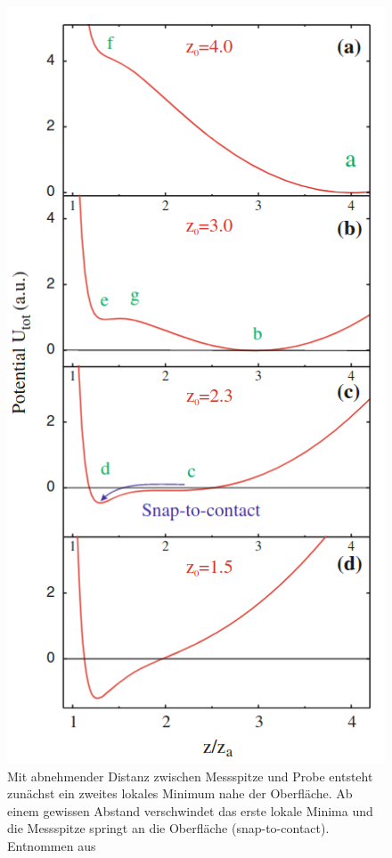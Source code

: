           \begin{figure}
            \includegraphics[scale = 0.45]{pictures/pot_contact.png}
            \caption{Mit abnehmender Distanz zwischen Messspitze und Probe entsteht zunächst ein zweites lokales Minimum nahe der Oberfläche. Ab einem gewissen Abstand verschwindet das erste lokale Minima und die Messspitze springt an die Oberfläche (snap-to-contact). Entnommen aus \cite{voigtlander_scanning_2015}}
            \label{fig:pot_contact}
          \end{figure}

